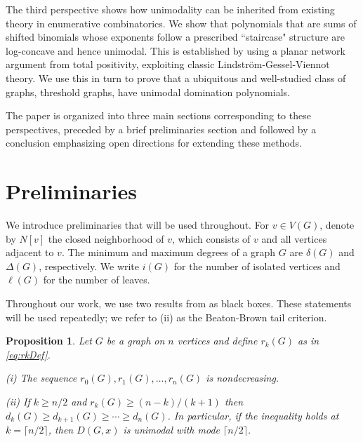 \documentclass[11pt]{amsart}
\newtheorem{proposition}[theorem]{Proposition}
\numberwithin{equation}{section}
\newcommand{\VV}{V(G)}
\begin{document}
The third perspective shows how unimodality can be inherited from existing theory in enumerative combinatorics. We show that polynomials that are sums of shifted binomials whose exponents follow a prescribed ``staircase" structure are log-concave and hence unimodal. This is established by using a planar network argument from total positivity, exploiting classic Lindstr\"{o}m-Gessel-Viennot theory. We use this in turn to prove that a ubiquitous and well-studied class of graphs, threshold graphs, have unimodal domination polynomials.

The paper is organized into three main sections corresponding to these perspectives, preceded by a brief preliminaries section and followed by a conclusion emphasizing open directions for extending these methods.

\section{Preliminaries}

We introduce preliminaries that will be used throughout. For $v\in\VV$, denote by $N[v]$ the closed neighborhood of $v$, which consists of $v$ and all vertices adjacent to $v$. The minimum and maximum degrees of a graph $G$ are $\delta(G)$ and $\Delta(G)$, respectively. We write $i(G)$ for the number of isolated vertices and $\ell(G)$ for the number of leaves. 

Throughout our work, we use two results from \cite{BeatonBrown2022} as black boxes. These statements will be used repeatedly; we refer to (ii) as the Beaton-Brown tail criterion.
\begin{proposition}\cite{BeatonBrown2022}\label{rem:BB}
Let $G$ be a graph on $n$ vertices and define $r_k(G)$ as in \eqref{eq:rkDef}.

\smallskip\noindent
(i) The sequence $r_0(G),r_1(G),\dots,r_n(G)$ is nondecreasing.

\smallskip\noindent
(ii) If $k\ge n/2$ and $r_k(G)\ge (n-k)/(k+1)$ then $d_k(G)\ge d_{k+1}(G)\ge\cdots\ge d_n(G)$. In particular, if the inequality holds at $k=\lceil n/2\rceil$, then $D(G,x)$ is unimodal with mode $\lceil n/2\rceil$.

\smallskip
\end{proposition}
\end{document}
